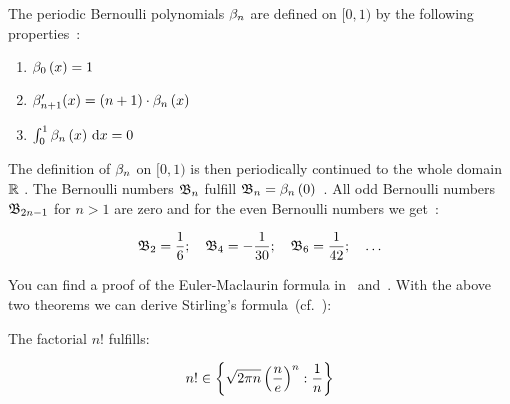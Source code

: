 The periodic Bernoulli polynomials $\bps$ are defined on $[0,1)$ by the following properties~\cite[p. 291]{koenigsberger}:

\begin{enumerate}
  \item $\bp[0]{x} = 1$
  \item $\bps[n+1]'(x) = (n+1)\cdot \bp{x}$
  \item $\int_0^1 \bp{x} \d{x} = 0$
\end{enumerate}

The definition of $\bps$ on $[0,1)$ is then periodically continued to the whole domain $\R$ . The Bernoulli numbers $\bn$ fulfill $\bn=\bp{0}$~\cite[p.~290]{koenigsberger}. All odd Bernoulli numbers $\bn[2n-1]$ for $n>1$ are zero and for the even Bernoulli numbers we get~\cite[p.~289]{koenigsberger}:

\begin{align}
  \bn[2] = \frac 16;\quad \bn[4]=-\frac{1}{30};\quad \bn[6]=\frac{1}{42};\quad \ldots
\end{align}

You can find a proof of the Euler-Maclaurin formula in~\cite[pp.~225-226]{koenigsberger} and~\cite[pp.~506-509]{heuser}. With the above two theorems we can derive Stirling's formula~(cf.~\cite[p.~228]{koenigsberger}):

\begin{theorem}
  The factorial $n!$ fulfills:

  \begin{align}
    n! \in \ean[\frac 1n]{\sqrt{2\pi n} \left(\frac ne\right)^n}
  \end{align}
\end{theorem}


